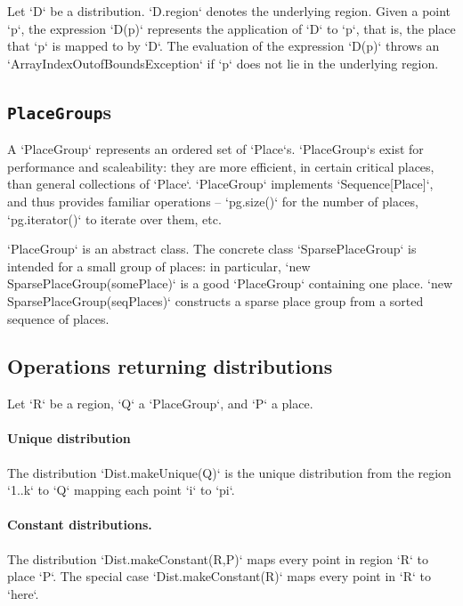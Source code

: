 Let \xcd`D` be a distribution. 
\xcd`D.region` 
denotes the underlying
region. 
Given a point \xcd`p`, the expression
\xcd`D(p)` represents the application of \xcd`D` to \xcd`p`, that is,
the place that \xcd`p` is mapped to by \xcd`D`. The evaluation of the
expression \xcd`D(p)` throws an \xcd`ArrayIndexOutofBoundsException`
if \xcd`p` does not lie in the underlying region.


\subsection{{\tt PlaceGroup}s}

A \xcd`PlaceGroup` represents an ordered set of \xcd`Place`s.
\xcd`PlaceGroup`s exist for performance and scaleability: they are more
efficient, in certain critical places, than general collections of
\xcd`Place`. \xcd`PlaceGroup` implements \xcd`Sequence[Place]`, and thus
provides familiar operations -- \xcd`pg.size()` for the number of places,
\xcd`pg.iterator()` to iterate over them, etc.  

\xcd`PlaceGroup` is an abstract class.  The concrete class
\xcd`SparsePlaceGroup` is intended for a small group of places: 
in particular, 
\xcd`new SparsePlaceGroup(somePlace)` is a good \xcd`PlaceGroup` containing
one place.  
\xcd`new SparsePlaceGroup(seqPlaces)`
constructs a sparse place group from a sorted sequence of places.

\subsection{Operations returning distributions}



Let \xcd`R` be a region, \xcd`Q` 
a \xcd`PlaceGroup`, and \xcd`P` a place.

\paragraph{Unique distribution} 
The distribution \xcd`Dist.makeUnique(Q)` is the unique distribution from the
region \xcd`1..k` to \xcd`Q` mapping each point \xcd`i` to \xcd`pi`.

\paragraph{Constant distributions.} 
The distribution \xcd`Dist.makeConstant(R,P)` maps every point in region
\xcd`R` to place \xcd`P`.  
The special case \xcd`Dist.makeConstant(R)` maps every point in \xcd`R` to
\xcd`here`. 

